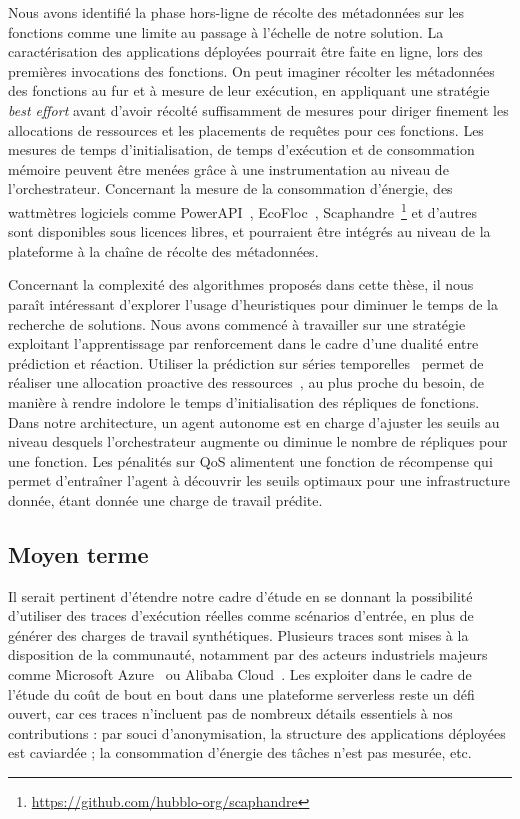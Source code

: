 Nous avons identifié la phase hors-ligne de récolte des métadonnées sur les fonctions comme une limite au passage à l'échelle de notre solution. La caractérisation des applications déployées pourrait être faite en ligne, lors des premières invocations des fonctions. On peut imaginer récolter les métadonnées des fonctions au fur et à mesure de leur exécution, en appliquant une stratégie \textit{best effort} avant d'avoir récolté suffisamment de mesures pour diriger finement les allocations de ressources et les placements de requêtes pour ces fonctions. Les mesures de temps d'initialisation, de temps d'exécution et de consommation mémoire peuvent être menées grâce à une instrumentation au niveau de l'orchestrateur. Concernant la mesure de la consommation d'énergie, des wattmètres logiciels comme PowerAPI~\cite{fieniPowerAPIPythonFramework2024}, EcoFloc~\cite{valeraEnergySavingPerspective}, Scaphandre~\footnote{\href{https://github.com/hubblo-org/scaphandre}{https://github.com/hubblo-org/scaphandre}} et d'autres~\cite{jayExperimentalComparisonSoftwarebased2023} sont disponibles sous licences libres, et pourraient être intégrés au niveau de la plateforme à la chaîne de récolte des métadonnées.

Concernant la complexité des algorithmes proposés dans cette thèse, il nous paraît intéressant d'explorer l'usage d'heuristiques pour diminuer le temps de la recherche de solutions. Nous avons commencé à travailler sur une stratégie exploitant l'apprentissage par renforcement dans le cadre d'une dualité entre prédiction et réaction. Utiliser la prédiction sur séries temporelles~\cite{bauerTimeSeriesForecasting2020} permet de réaliser une allocation proactive des ressources~\cite{parkGraphNeuralNetworkBased2024, handaouiReLeaSERReinforcementLearning2020}, au plus proche du besoin, de manière à rendre indolore le temps d'initialisation des répliques de fonctions. Dans notre architecture, un agent autonome est en charge d'ajuster les seuils au niveau desquels l'orchestrateur augmente ou diminue le nombre de répliques pour une fonction. Les pénalités sur \gls{QoS} alimentent une fonction de récompense qui permet d'entraîner l'agent à découvrir les seuils optimaux pour une infrastructure donnée, étant donnée une charge de travail prédite.

\subsection{Moyen terme}

Il serait pertinent d'étendre notre cadre d'étude en se donnant la possibilité d'utiliser des traces d'exécution réelles comme scénarios d'entrée, en plus de générer des charges de travail synthétiques. Plusieurs traces sont mises à la disposition de la communauté, notamment par des acteurs industriels majeurs comme Microsoft Azure~\cite{cortezResourceCentralUnderstanding2017a} ou Alibaba Cloud~\cite{mahmoudiSimFaaSPerformanceSimulator2021}. Les exploiter dans le cadre de l'étude du coût de bout en bout dans une plateforme serverless reste un défi ouvert, car ces traces n'incluent pas de nombreux détails essentiels à nos contributions : par souci d'anonymisation, la structure des applications déployées est caviardée ; la consommation d'énergie des tâches n'est pas mesurée, etc.

